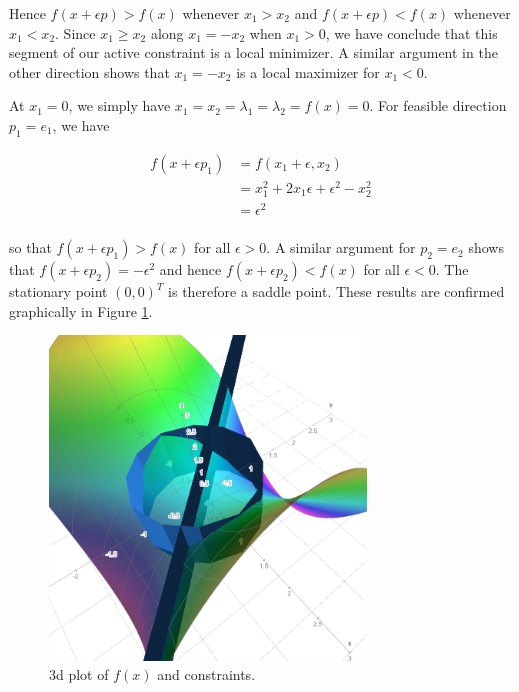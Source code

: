 \begin{solution}
    Hence $f(x + \epsilon p) > f(x)$ whenever $x_1 > x_2$ and $f(x + \epsilon p) < f(x)$ whenever $x_1 < x_2$. Since
    $x_1 \ge x_2$ along $x_1 = -x_2$ when $x_1 > 0$, we have conclude that this segment of our active constraint is a
    local minimizer. A similar argument in the other direction shows that $x_1 = -x_2$ is a local maximizer for 
    $x_1 < 0$.

    At $x_1 = 0$, we simply have $x_1 = x_2 = \lambda_1 = \lambda_2 = f(x) = 0$. For feasible direction $p_1 = e_1$, we
    have


    \begin{align*}
        f(x + \epsilon p_1) &= f(x_1 + \epsilon, x_2) \\
                            &= x_1^2 + 2x_1 \epsilon + \epsilon^2 - x_2^2 \\
                            &= \epsilon^2 \\
    \end{align*}

    so that $f(x + \epsilon p_1) > f(x)$ for all $\epsilon > 0$. A similar argument for $p_2 = e_2$ shows that 
    $f(x + \epsilon p_2) = -\epsilon^2$ and hence $f(x + \epsilon p_2) < f(x)$ for all $\epsilon < 0$. The stationary 
    point $(0, 0)^T$ is therefore a saddle point. These results are confirmed graphically in Figure 
    \ref{fig:problem_4b}.

    \begin{figure}[h]
        \centering
        \includegraphics*[width=0.75\textwidth]{problem_4b.png}
        \caption{3d plot of $f(x)$ and constraints.}
        \label{fig:problem_4b}
    \end{figure}


\end{solution}
